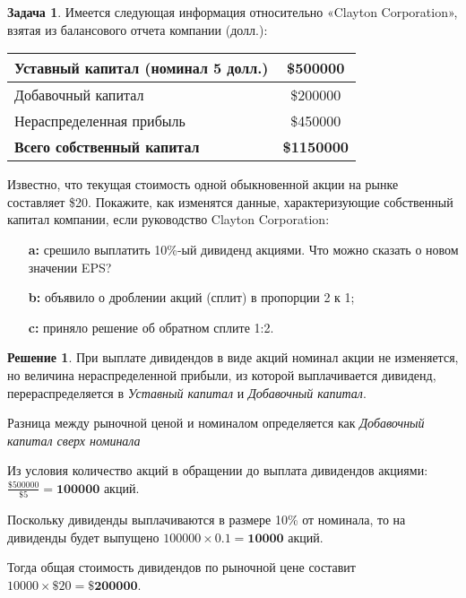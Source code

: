 \documentclass[a4paper, 14pt]{article}
\theoremstyle{plain} %
\theoremstyle{definition} %
\newtheorem*{solution}{Решение}
\newtheorem{problem}{Задача}[subsection]
\theoremstyle{remark} %
\begin{document}
\begin{problem}
	Имеется следующая информация относительно «Clayton Corporation», взятая из балансового отчета компании (долл.):
	\begin{center}
	\begin{tabular}{|l|c|}
	\hline
	Уставный капитал (номинал 5 долл.) & \$500000   \\
	\hline
	Добавочный капитал                 & \$200000   \\
	\hline
	Нераспределенная прибыль           & \$450000   \\
	\hline
	\textbf{Всего собственный капитал}          & \textbf{\$1150000}  \\
	\hline
	\end{tabular}
	\end{center}

Известно, что текущая стоимость одной обыкновенной акции на рынке составляет \$20. Покажите, как изменятся данные, характеризующие собственный капитал компании, если руководство Clayton Corporation:
\begin{itemize}
	\item[\textbf{a:}] срешило  выплатить  10\%-ый  дивиденд  акциями.  Что  можно  сказать  о  новом значении EPS?
	\item[\textbf{b:}] объявило о дроблении акций (сплит) в пропорции 2 к 1;
	\item[\textbf{c:}] приняло решение об обратном сплите 1:2.
\end{itemize}
	\begin{solution}
		При выплате дивидендов в виде акций номинал акции не изменяется, но 	величина нераспределенной прибыли, из которой выплачивается дивиденд, перераспределяется в \textit{Уставный капитал} и \textit{Добавочный капитал}.

		Разница между рыночной ценой и номиналом определяется как \textit{Добавочный капитал сверх номинала}

		Из условия количество акций в обращении до выплата дивидендов акциями: $\frac{\$500000}{\$5} = \textbf{100000 акций}$.

		Поскольку дивиденды выплачиваются в размере 10\% от номинала, то на дивиденды будет выпущено $100000\times0.1 = \textbf{10000 акций}$.

		Тогда общая стоимость дивидендов по рыночной цене составит $10000\times\$20 = \textbf{\$200000}$.


\end{solution}
\end{problem}
\end{document}
